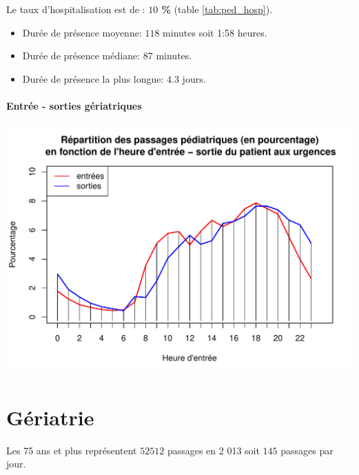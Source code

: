 \documentclass[12pt,english,french,twoside]{book}\usepackage[]{graphicx}\usepackage[]{color}
\makeatletter
\def\maxwidth{ %
  \ifdim\Gin@nat@width>\linewidth
    \linewidth
  \else
    \Gin@nat@width
  \fi
}
\newenvironment{knitrout}{}{} %
\makeatother
\begin{document}
Le taux d'hospitalisation est de : \textbf{$10$ \%} (table \ref{tab:ped_hosp}).





\begin{itemize}
  \item Durée de présence moyenne: $118$ minutes soit 1:58 heures.
  \item Durée de présence médiane: $87$ minutes.
  \item Durée de présence la plus longue: $4.3$ jours.
\end{itemize}

\subsubsection*{Entrée - sorties gériatriques}

\begin{knitrout}
\color{fgcolor}
\includegraphics[width=\maxwidth]{figure/es_pediatriques} 

\end{knitrout}



\chapter{Gériatrie}


\label{chap_geriatrie}




Les 75 ans et plus représentent $52 512$ passages en 2 013 soit $145$ passages par jour.
\end{document}
